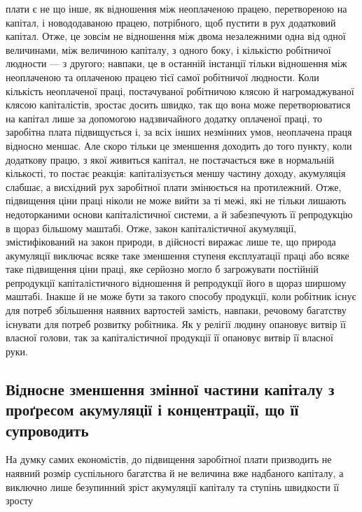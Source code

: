 \parcont{}  %
плати є не що інше, як відношення між неоплаченою працею,
перетвореною на капітал, і новододаваною працею, потрібного, щоб
пустити в рух додатковий капітал. Отже, це зовсім не відношення
між двома незалежними одна від одної величинами, між величиною
капіталу, з одного боку, і кількістю робітничої людности —
з другого; навпаки, це в останній інстанції тільки відношення
між неоплаченою та оплаченою працею тієї самої робітничої людности.
Коли кількість неоплаченої праці, постачуваної робітничою
клясою й нагромаджуваної клясою капіталістів, зростає
досить швидко, так що вона може перетворюватися на капітал
лише за допомогою надзвичайного додатку оплаченої праці, то
заробітна плата підвищується і, за всіх інших незмінних умов,
неоплачена праця відносно меншає. Але скоро тільки це зменшення
доходить до того пункту, коли додаткову працю, з якої
живиться капітал, не постачається вже в нормальній кількості,
то постає реакція: капіталізується меншу частину доходу, акумуляція
слабшає, а висхідний рух заробітної плати змінюється
на протилежний. Отже, підвищення ціни праці ніколи не може
вийти за ті межі, які не тільки лишають недоторканими основи
капіталістичної системи, а й забезпечують її репродукцію в
щораз більшому маштабі. Отже, закон капіталістичної акумуляції,
змістифікований на закон природи, в дійсності виражає
лише те, що природа акумуляції виключає всяке таке зменшення
ступеня експлуатації праці або всяке таке підвищення ціни
праці, яке серйозно могло б загрожувати постійній репродукції
капіталістичного відношення й репродукції його в щораз ширшому
маштабі. Інакше й не може бути за такого способу продукції,
коли робітник існує для потреб збільшення наявних вартостей
замість, навпаки, речовому багатству існувати для потреб
розвитку робітника. Як у релігії людину опановує витвір її власної
голови, так за капіталістичної продукції її опановує витвір
її власної руки.

\subsection{Відносне зменшення змінної частини капіталу з проґресом
акумуляції і концентрації, що її супроводить}

На думку самих економістів, до підвищення заробітної плати
призводить не наявний розмір суспільного багатства й не величина
вже надбаного капіталу, а виключно лише безупинний
зріст акумуляції капіталу та ступінь швидкости її зросту
\parbreak{}  %

